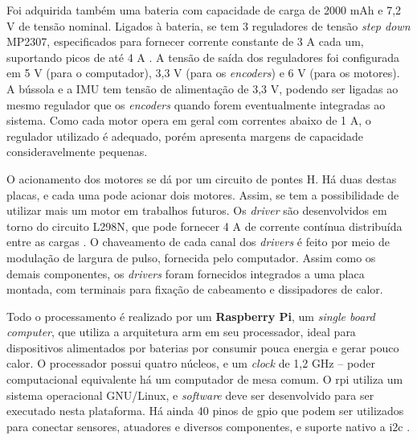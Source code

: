 Foi adquirida também uma bateria com capacidade de carga de 2000 mAh e 7,2 V de tensão nominal. Ligados à bateria, se tem 3 reguladores de tensão \textit{step down} MP2307, especificados para fornecer corrente constante de 3 A cada um, suportando picos de até 4 A \citep{MP2307}. A tensão de saída dos reguladores foi configurada em 5 V (para o computador), 3,3 V (para os \textit{encoders}) e 6 V (para os motores). A bússola e a IMU tem tensão de alimentação de 3,3 V, podendo ser ligadas ao mesmo regulador que os \textit{encoders} quando forem eventualmente integradas ao sistema. Como cada motor opera em geral com correntes abaixo de 1 A, o regulador utilizado é adequado, porém apresenta margens de capacidade consideravelmente pequenas.

O acionamento dos motores se dá por um circuito de pontes H. Há duas destas placas, e cada uma pode acionar dois motores. Assim, se tem a possibilidade de utilizar mais um motor em trabalhos futuros. Os \textit{driver} são desenvolvidos em torno do circuito L298N, que pode fornecer 4 A de corrente contínua distribuída entre as cargas \citep{L298N}. O chaveamento de cada canal dos \textit{drivers} é feito por meio de modulação de largura de pulso, fornecida pelo computador. Assim como os demais componentes, os \textit{drivers} foram fornecidos integrados a uma placa montada, com terminais para fixação de cabeamento e dissipadores de calor.

Todo o processamento é realizado por um \textbf{Raspberry Pi}, um \emph{single board computer}, que utiliza a arquitetura \acrshort{arm} em seu processador, ideal para dispositivos alimentados por baterias por consumir pouca energia e gerar pouco calor. O processador possui quatro núcleos, e um \emph{clock} de 1,2 GHz -- poder computacional equivalente há um computador de mesa comum. O \acrshort{rpi} utiliza um sistema operacional GNU/Linux, e \emph{software} deve ser desenvolvido para ser executado nesta plataforma. Há ainda 40 pinos de \acrshort{gpio} que podem ser utilizados para conectar sensores, atuadores e diversos componentes, e suporte nativo a \acrshort{i2c} \citep{upton2014raspberry}.

